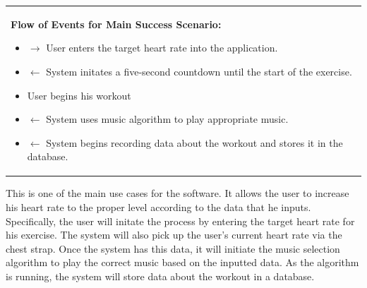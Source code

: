 \documentclass[letterpaper,english, 12pt]{scrreprt}
\begin{document}
\begin{center}
\begin{tabular}{|C{15cm}|}
\begin{itemize}
                                \end{itemize}
                        \begin{flushleft}
                                \textbf{Flow of Events for Main Success Scenario: }
                        \end{flushleft}
                                \begin{itemize}
                                        \item $\rightarrow$ User enters the target heart rate into the application.
                                        \item $\leftarrow$ System initates a five-second countdown until the start of the exercise.
                                        \item User begins his workout
                                        \item $\leftarrow$ System uses music algorithm to play appropriate music.
                                        \item $\leftarrow$ System begins recording data about the workout and stores it in the database.
                                \end{itemize}
               	\hline
        \end{tabular}
\end{center}

This is one of the main use cases for the software. It allows the user to increase his heart rate to the proper level according to the data that he inputs. Specifically, the user will initate the process by entering the target heart rate for his exercise. The system will also pick up the user's current heart rate via the chest strap. Once the system has this data, it will initiate the music selection algorithm to play the correct music based on the inputted data. As the algorithm is running, the system will store data about the workout in a database.
\end{document}
